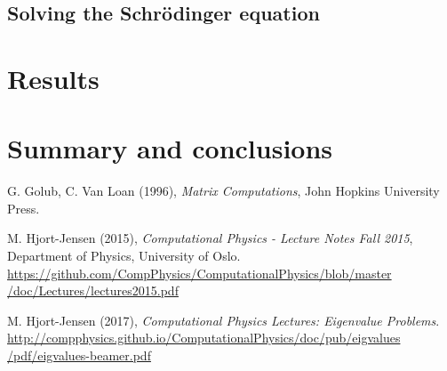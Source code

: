 \documentclass[12pt, a4paper]{article}
\begin{document}
\subsection{Solving the Schrödinger equation}



\section{Results}

\section{Summary and conclusions}

\begin{thebibliography}{40}

 G. Golub, C. Van Loan (1996), \textit{Matrix Computations}, John Hopkins University 
Press. 

 M. Hjort-Jensen (2015), \textit{Computational Physics - Lecture Notes Fall 2015}, 
Department of Physics, University of Oslo. \\ 
\href{https://github.com/CompPhysics/ComputationalPhysics/blob/master/doc/Lectures/lectures2015.pdf}
{https://github.com/CompPhysics/ComputationalPhysics/blob/master\\/doc/Lectures/lectures2015.pdf}

 M. Hjort-Jensen (2017), \textit{Computational Physics Lectures: 
Eigenvalue Problems}. 
\href{http://compphysics.github.io/ComputationalPhysics/doc/pub/eigvalues/pdf/eigvalues-beamer.pdf}
{http://compphysics.github.io/ComputationalPhysics/doc/pub/eigvalues\\/pdf/eigvalues-beamer.pdf}

\end{thebibliography}
\end{document}
